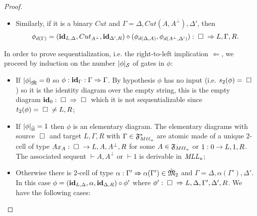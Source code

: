 \documentclass[a4paper]{article}
\begin{document}
\begin{theorem}
\begin{proof}
\begin{itemize}
\begin{itemize}
\item Similarly, if it is a binary $Cut$ and $\Gamma= \Delta, Cut(A, A^\bot), \Delta'$, then
$$\phi_{d(\Gamma)}=(\textbf{id}_{L,\Delta},Cut_{A^\bot}, \textbf{id}_{\Delta',R}) \circ (\phi_{d(\Delta, A)} , \phi_{d(A^\bot, \Delta')}): \; \square \; \Rightarrow L, \Gamma, R. $$




\end{itemize}
\end{itemize}


In order to prove sequentialization, i.e. the right-to-left implication $\Leftarrow$, we proceed by induction on the number $|\phi|_\mathcal S$ of gates in $\phi$:
\begin{itemize}


\item If $|\phi|_{ \tilde{\mathfrak{M}}}=0$ so $\phi: \textbf{id}_\Gamma: \Gamma \Rightarrow \Gamma$. By hypothesis $\phi$ has no input (i.e. $s_2(\phi)=\; \square \;$) so it is the identity  diagram over the empty string, this is the empty diagram $\textbf{id}_0: \; \square \;\Rightarrow \; \square \;$ which it is not sequentializable since $t_2(\phi)=\; \square \; \neq L,R$;

\item If  $|\phi|_{ {\tilde{\mathfrak{U}}}}=1$ then $\phi$ is an elementary diagram. The elementary diagrams with source $\; \square \;$ and target $L,\Gamma, R$ with $\Gamma \in {{\mathfrak{F}}^*_{M\ell \ell _u}}$ are atomic made of a unique $2$-cell of type $Ax_A: \; \square \; \rightarrow L, A, A^\bot, R$ for some  $A\in {\mathfrak{F}_{M\ell \ell _u}}$ or $1: 0 \rightarrow L,1,R$. The associated sequent $\vdash A, A^\bot$ or $\vdash 1$ is derivable in $\mathit{MLL_u}$;


\item Otherwise there is  $2$-cell of type  $\alpha: \Gamma' \Rightarrow \alpha ( \Gamma' ) \in \tilde{\mathfrak{M}}_2$ and  $\Gamma= \Delta, \alpha (\Gamma' ), \Delta'$. In this case $\phi= (\textbf{id}_{L, \Delta} , \alpha , \textbf{id}_{\Delta, R}) \circ \phi' $ where $\phi': \; \square \; \Rightarrow L,\Delta, \Gamma', \Delta',R$. We have the following cases:


\end{itemize}
\end{proof}
\end{theorem}
\end{document}
